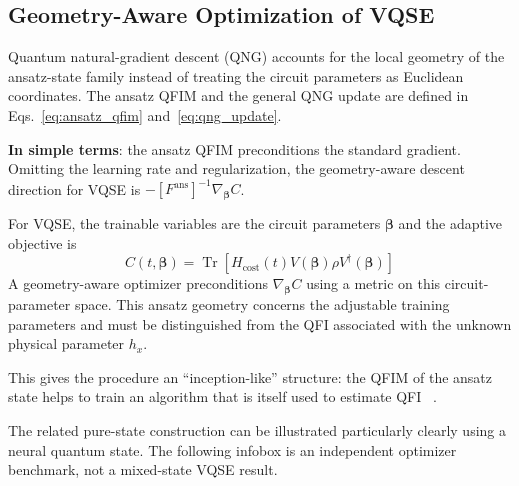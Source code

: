 \subsection{Geometry-Aware Optimization of VQSE}\label{sec:vqse_qng_optimization}

Quantum natural-gradient descent (QNG) accounts for the local geometry of the ansatz-state family instead of treating the circuit parameters as Euclidean coordinates. The ansatz QFIM and the general QNG update are defined in Eqs.~\eqref{eq:ansatz_qfim} and~\eqref{eq:qng_update}.

\noindent\faLightbulb\hspace{5pt}\textbf{In simple terms}: the ansatz QFIM preconditions the standard gradient. Omitting the learning rate and regularization, the geometry-aware descent direction for VQSE is
$-[F^{\mathrm{ans}}]^{-1}\nabla_{\boldsymbol{\beta}}C$.

For VQSE, the trainable variables are the circuit parameters $\boldsymbol{\beta}$ and the adaptive objective is
\begin{equation}
    C(t,\boldsymbol{\beta})
    =\operatorname{Tr}\!\left[
        H_{\mathrm{cost}}(t)
        V(\boldsymbol{\beta})\rho V^\dagger(\boldsymbol{\beta})
        \right]
    \label{eq:vqse_adaptive_objective}
\end{equation}
A geometry-aware optimizer preconditions $\nabla_{\boldsymbol{\beta}}C$ using a metric on this circuit-parameter space. This ansatz geometry concerns the adjustable training parameters and must be distinguished from the QFI associated with the unknown physical parameter $h_x$.

This gives the procedure an \enquote{inception-like} structure: the QFIM of the ansatz state helps to train an algorithm that is itself used to estimate QFI \inceptiontop[0.2]~\cite{nolan2010inception}.

The related pure-state construction can be illustrated particularly clearly using a neural quantum state. The following infobox is an independent optimizer benchmark, not a mixed-state VQSE result.

